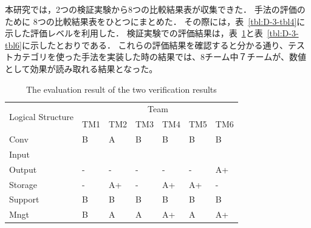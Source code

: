 \documentclass[a4paper,12pt]{jreport}
\begin{document}
  本研究では，2つの検証実験から8つの比較結果表が収集できた．
  手法の評価のために 8つの比較結果表をひとつにまとめた．
その際には，表~\ref{tbl:D-3-tbl4}に示した評価レベルを利用した． 検証実験での評価結果は，表~\ref{tbl:D-3-tbl5}と表~\ref{tbl:D-3-tbl6}に示したとおりである．
これらの評価結果を確認すると分かる通り、テストカテゴリを使った手法を実装した時の結果では、8チーム中７チームが、数値として効果が読み取れる結果となった。

\begin{table}[htbp]
  \centering
  \caption{The evaluation result of the two verification results}
    \begin{tabular}{|l|l|l|l|l|l|l|}
    \hline
    \multicolumn{1}{|c|}{\multirow{2}[4]{*}{Logical
Structure}} & \multicolumn{6}{c|}{Team} \bigstrut\\
\cline{2-7}          & TM1   & TM2   & TM3   & TM4   & TM5   & TM6 \bigstrut\\
    \hline
    Conv  & B     & A     & B     & B     & B     & B \bigstrut\\
    \hline
    Input &       &       &       &       &       &  \bigstrut\\
    \hline
    Output & -     & -     & -     & -     & -     & A+ \bigstrut\\
    \hline
    Storage & -     & A+    & -     & A+    & A+    & - \bigstrut\\
    \hline
    Support & B     & B     & B     & B     & B     & B \bigstrut[t]\\
    Mngt  & B     & A     & A     & A+    & A     & A+ \bigstrut[b]\\
    \hline
    \end{tabular}%
  \label{tbl:D-3-tbl5}%
\end{table}%
\end{document}

